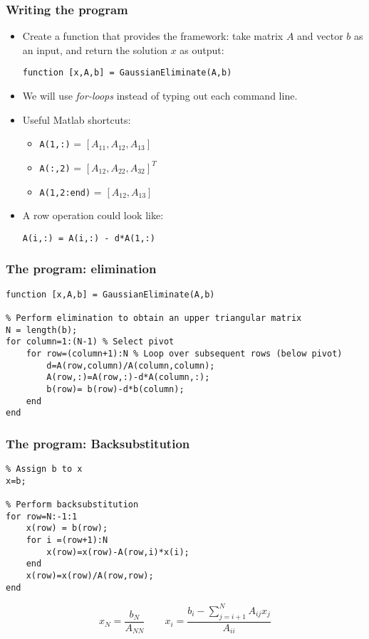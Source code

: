 \documentclass[11pt,table,final,xcolor={usenames,dvipsnames,table}]{beamer}
\begin{document}
\begin{frame}[fragile]
  \frametitle{Writing the program}
  \begin{itemize}
   \item Create a function that provides the framework: take matrix $A$ and vector $b$ as an input, and return the solution $x$ as output:
  \begin{lstlisting}
function [x,A,b] = GaussianEliminate(A,b)
  \end{lstlisting}
  \item We will use \emph{for-loops} instead of typing out each command line.
  \item Useful Matlab shortcuts:
  \begin{itemize}
  \item \lstinline$A(1,:)$   = $[A_{11}, A_{12}, A_{13}]$
  \item \lstinline$A(:,2)$   = $[A_{12}, A_{22}, A_{32}]^T$
  \item \lstinline$A(1,2:end)$ = $[A_{12}, A_{13}]$
  \end{itemize}
  \item A row operation could look like:
  \begin{lstlisting}
A(i,:) = A(i,:) - d*A(1,:)   
  \end{lstlisting}
  \end{itemize}
\end{frame}

\begin{frame}[fragile]
  \frametitle{The program: elimination}
  \begin{lstlisting}
function [x,A,b] = GaussianEliminate(A,b)

% Perform elimination to obtain an upper triangular matrix
N = length(b);
for column=1:(N-1) % Select pivot
    for row=(column+1):N % Loop over subsequent rows (below pivot)
        d=A(row,column)/A(column,column);
        A(row,:)=A(row,:)-d*A(column,:);
        b(row)= b(row)-d*b(column);
    end
end
  \end{lstlisting}
\end{frame}

\begin{frame}[fragile]
  \frametitle{The program: Backsubstitution}
  \begin{lstlisting}
% Assign b to x
x=b;

% Perform backsubstitution
for row=N:-1:1
    x(row) = b(row);
    for i =(row+1):N
        x(row)=x(row)-A(row,i)*x(i);
    end
    x(row)=x(row)/A(row,row);
end
  \end{lstlisting}
  \[
     x_N = \frac{b_N}{A_{NN}} \qquad x_i = \frac{b_i - \sum_{j=i+1}^{N}A_{ij}x_j}{A_{ii}}
  \]
\end{frame}
\end{document}
